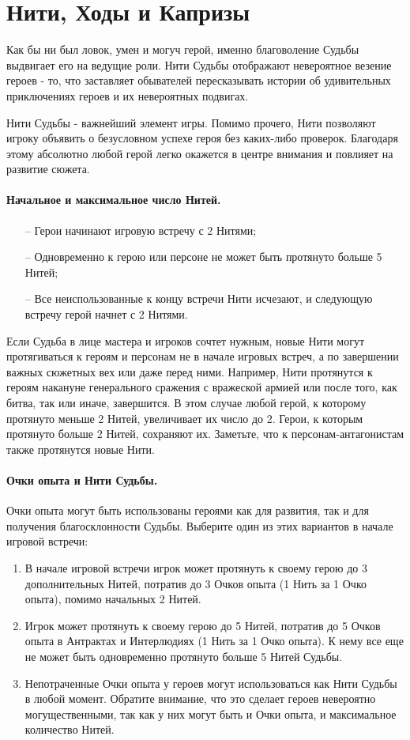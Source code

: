 \section{Нити, Ходы и Капризы}
Как бы ни был ловок, умен и могуч герой, именно благоволение Судьбы выдвигает его на ведущие роли. Нити Судьбы отображают невероятное везение героев - то,
что заставляет обывателей пересказывать истории об удивительных приключениях героев и их невероятных подвигах. 
\begin{tcolorbox}
    Нити Судьбы - важнейший элемент игры. Помимо прочего, Нити позволяют игроку объявить о безусловном успехе героя без каких-либо проверок. Благодаря этому абсолютно любой герой легко окажется в центре внимания и повлияет на развитие сюжета.
\end{tcolorbox}

\paragraph{Начальное и максимальное число Нитей.}
\begin{itemize}
    \item[--] Герои начинают игровую встречу с 2 Нитями;
    \item[--] Одновременно к герою или персоне не может быть протянуто больше 5 Нитей;
    \item[--] Все неиспользованные к концу встречи Нити исчезают, и следующую встречу герой начнет с 2 Нитями.
\end{itemize}
Если Судьба в лице мастера и игроков сочтет нужным, новые Нити могут протягиваться к героям и персонам не в начале игровых встреч, а по завершении важных сюжетных вех или даже перед ними. Например, Нити протянутся к героям накануне генерального сражения с вражеской армией или после того, как битва, так или иначе, завершится. В этом случае любой герой, к которому протянуто меньше 2 Нитей, увеличивает их число до 2. Герои, к которым протянуто больше 2 Нитей, сохраняют их. Заметьте, что к персонам-антагонистам также протянутся новые Нити.
\paragraph{Очки опыта и Нити Судьбы.} Очки опыта могут быть использованы героями как для развития, так и для получения благосклонности Судьбы. Выберите один из этих вариантов в начале игровой встречи:
\begin{enumerate}
    \item В начале игровой встречи игрок может протянуть к своему герою до 3 дополнительных Нитей, потратив до 3 Очков опыта (1 Нить за 1 Очко опыта), помимо начальных 2 Нитей.
    \item Игрок может протянуть к своему герою до 5 Нитей, потратив до 5 Очков опыта в Антрактах и Интерлюдиях (1 Нить за 1 Очко опыта). К нему все еще не может быть одновременно протянуто больше 5 Нитей Судьбы.
    \item Непотраченные Очки опыта у героев могут использоваться как Нити Судьбы в любой момент. Обратите внимание, что это сделает героев невероятно могущественными, так как у них могут быть и Очки опыта, и максимальное количество Нитей.
\end{enumerate}

